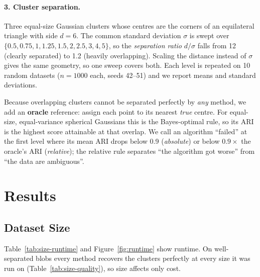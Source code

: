 \documentclass[11pt,letterpaper]{article}
\newcommand{\gentable}[2][\linewidth]{%
  \resizebox{#1}{!}{}}
\begin{document}
\paragraph{3. Cluster separation.} Three equal-size Gaussian clusters whose
centres are the corners of an equilateral triangle with side $d=6$. The
common standard deviation $\sigma$ is swept over
$\{0.5,\allowbreak 0.75,\allowbreak 1,\allowbreak 1.25,\allowbreak 1.5,\allowbreak 2,\allowbreak 2.5,\allowbreak 3,\allowbreak 4,\allowbreak 5\}$, so the \emph{separation ratio}
$d/\sigma$ falls from 12 (clearly separated) to 1.2 (heavily overlapping).
Scaling the distance instead of $\sigma$ gives the same geometry, so one
sweep covers both. Each level is repeated on 10 random datasets
($n=1000$ each, seeds 42--51) and we report means and standard deviations.

Because overlapping clusters cannot be separated perfectly by \emph{any}
method, we add an \textbf{oracle} reference: assign each point to its nearest
\emph{true} centre. For equal-size, equal-variance spherical Gaussians this is
the Bayes-optimal rule, so its ARI is the highest score attainable at that
overlap. We call an algorithm ``failed'' at the first level where its mean ARI
drops below 0.9 (\emph{absolute}) or below $0.9\times$ the oracle's ARI
(\emph{relative}); the relative rule separates ``the algorithm got worse'' from
``the data are ambiguous''.

\section{Results}

\subsection{Dataset Size}
\label{sec:size}

Table~\ref{tab:size-runtime} and Figure~\ref{fig:runtime} show runtime. On
well-separated blobs every method recovers the clusters perfectly at every
size it was run on (Table~\ref{tab:size-quality}), so size affects only cost.

\begin{table}[H]
\centering
\caption{Median runtime (seconds) by dataset size; fastest in bold.
``--'': hierarchical methods not run above 5{,}000 points.}
\label{tab:size-runtime}
\gentable[0.62\linewidth]{size_runtime.tex}
\end{table}
\end{document}
